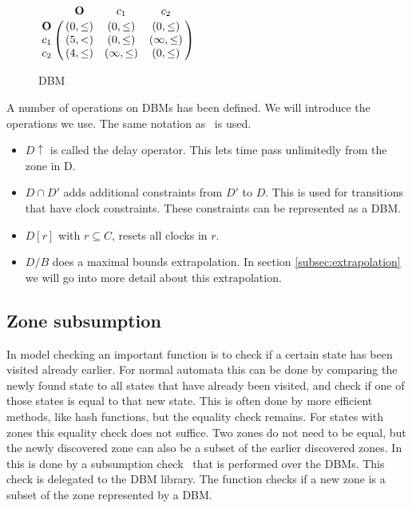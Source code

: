 \begin{figure}
	\centering
	\begin{math}
 \bordermatrix{ 		                 & \mathbf{O} & c_1           & c_2        \cr
 			\mathbf{O} &(0,\leq)      & (0,\leq)      & (0,\leq)     \cr
 			c_1        &(5,<   )      & (0,\leq)      & (\infty,\leq)\cr
 			c_2        &(4,\leq)      & (\infty,\leq) & (0,\leq)     \cr}
	\end{math}
	\caption{DBM}
	\label{fig:dbm}
\end{figure}

A number of operations on DBMs has been defined. We will introduce the operations we use. The same notation as~\cite{eemcs21972} is used.
\begin{itemize}
\item $D \uparrow$ is called the delay operator. This lets time pass unlimitedly from the zone in D.
\item $D \cap D'$ adds additional constraints from $D'$ to $D$. This is used for transitions that have clock constraints. These constraints can be represented as a DBM.
\item $D[r]$ with $r \subseteq C$, resets all clocks in $r$.
\item $D/B$ does a maximal bounds extrapolation. In section \ref{subsec:extrapolation} we will go into more detail about this extrapolation.

\end{itemize}

\subsection{Zone subsumption}
\label{subsec:subsumtion}
In model checking an important function is to check if a certain state has been visited already earlier. For normal automata this can be done by comparing the newly found state to all states that have already been visited, and check if one of those states is equal to that new state. This is often done by more efficient methods, like hash functions, but the equality check remains. For states with zones this equality check does not suffice. Two zones do not need to be equal, but the newly discovered zone can also be a subset of the earlier discovered zones. In \ltsmin{} this is done by a subsumption check~\cite{eemcs21972} that is performed over the DBMs. This check is delegated to the \uppaal{} DBM library. The function checks if a new zone is a subset of the zone represented by a DBM.

